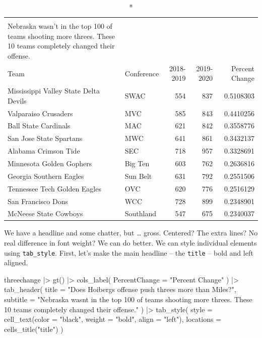 \documentclass[
  letterpaper,
  DIV=11,
  numbers=noendperiod]{scrreprt}
\newenvironment{Shaded}{\begin{snugshade}}{\end{snugshade}}
\newcommand{\AttributeTok}[1]{\textcolor[rgb]{0.40,0.45,0.13}{#1}}
\newcommand{\FunctionTok}[1]{\textcolor[rgb]{0.28,0.35,0.67}{#1}}
\newcommand{\NormalTok}[1]{\textcolor[rgb]{0.00,0.23,0.31}{#1}}
\newcommand{\SpecialCharTok}[1]{\textcolor[rgb]{0.37,0.37,0.37}{#1}}
\newcommand{\StringTok}[1]{\textcolor[rgb]{0.13,0.47,0.30}{#1}}
\begin{document}
\begin{longtable}{llrrr}
\caption*{
{\large Does Hoiberg's offense push threes more than Miles?} \\ 
{\small Nebraska wasn't in the top 100 of teams shooting more threes. These 10 teams completely changed their offense.}
} \\ 
\toprule
Team & Conference & 2018-2019 & 2019-2020 & Percent Change \\ 
\midrule\addlinespace[2.5pt]
Mississippi Valley State Delta Devils & SWAC & 554 & 837 & 0.5108303 \\ 
Valparaiso Crusaders & MVC & 585 & 843 & 0.4410256 \\ 
Ball State Cardinals & MAC & 621 & 842 & 0.3558776 \\ 
San Jose State Spartans & MWC & 641 & 861 & 0.3432137 \\ 
Alabama Crimson Tide & SEC & 718 & 957 & 0.3328691 \\ 
Minnesota Golden Gophers & Big Ten & 603 & 762 & 0.2636816 \\ 
Georgia Southern Eagles & Sun Belt & 631 & 792 & 0.2551506 \\ 
Tennessee Tech Golden Eagles & OVC & 620 & 776 & 0.2516129 \\ 
San Francisco Dons & WCC & 728 & 899 & 0.2348901 \\ 
McNeese State Cowboys & Southland & 547 & 675 & 0.2340037 \\ 
\bottomrule
\end{longtable}

We have a headline and some chatter, but \ldots{} gross. Centered? The
extra lines? No real difference in font weight? We can do better. We can
style individual elements using \texttt{tab\_style}. First, let's make
the main headline -- the \texttt{title} -- bold and left aligned.

\begin{Shaded}
\begin{Highlighting}[]
\NormalTok{threechange }\SpecialCharTok{|\textgreater{}} 
  \FunctionTok{gt}\NormalTok{() }\SpecialCharTok{|\textgreater{}} 
  \FunctionTok{cols\_label}\NormalTok{(}
    \AttributeTok{PercentChange =} \StringTok{"Percent Change"}
\NormalTok{  ) }\SpecialCharTok{|\textgreater{}}
  \FunctionTok{tab\_header}\NormalTok{(}
    \AttributeTok{title =} \StringTok{"Does Hoiberg\textquotesingle{}s offense push threes more than Miles?"}\NormalTok{,}
    \AttributeTok{subtitle =} \StringTok{"Nebraska wasn\textquotesingle{}t in the top 100 of teams shooting more threes. These 10 teams completely changed their offense."}
\NormalTok{  ) }\SpecialCharTok{|\textgreater{}} \FunctionTok{tab\_style}\NormalTok{(}
    \AttributeTok{style =} \FunctionTok{cell\_text}\NormalTok{(}\AttributeTok{color =} \StringTok{"black"}\NormalTok{, }\AttributeTok{weight =} \StringTok{"bold"}\NormalTok{, }\AttributeTok{align =} \StringTok{"left"}\NormalTok{),}
    \AttributeTok{locations =} \FunctionTok{cells\_title}\NormalTok{(}\StringTok{"title"}\NormalTok{)}
\NormalTok{  )}
\end{Highlighting}
\end{Shaded}
\end{document}
